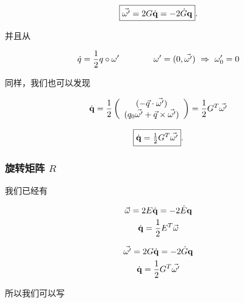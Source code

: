 \begin{equation}
\fbox{$ \vec{\omega'} = 2G\dot{\mathbf{q}} = -2\dot{G}\mathbf{q} $} .
\label{eqGq}
\end{equation}



并且从

\begin{equation*}
\dot{q} = \frac{1}{2} q \o \w'     \qquad \qquad  \w' = (0,\vec{\w'}) \ \Rightarrow \ \w'_0=0
\end{equation*}

同样，我们也可以发现

\begin{equation*}
\dot{\mathbf{q}} = \frac{1}{2} \left( \begin{array}{c}
(-\vec{q} \cdot \vec{\omega'})\\
(q_0\vec{\omega'} + \vec{q} \times \vec{\omega'})
\end{array} \right) = \frac{1}{2} G^T\vec{\omega'}
\end{equation*}

\begin{equation}
\fbox{$ \dot{\mathbf{q}} = \frac{1}{2} G^T\vec{\omega'} $} .
\label{eqqdot}
\end{equation}




\subsubsection{旋转矩阵 $R$}

我们已经有

\begin{minipage}[left]{0.49 \textwidth}
	\begin{gather*}
	   	 \vec{\omega} = 2E\dot{\mathbf{q}} = -2\dot{E}\mathbf{q}  \\
		\dot{\mathbf{q}} = \frac{1}{2} E^T\vec{\omega}
	\end{gather*}
\end{minipage}
\begin{minipage}[right]{0.49 \textwidth}
	\begin{gather*}
	   	 \vec{\omega'} = 2G\dot{\mathbf{q}} = -2\dot{G}\mathbf{q}  \\
		\dot{\mathbf{q}} = \frac{1}{2} G^T\vec{\omega'}
	\end{gather*}
\end{minipage}


所以我们可以写

